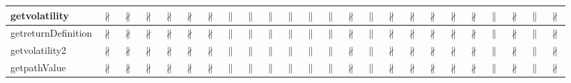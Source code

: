 \documentclass[10pt]{article}
\begin{document}
\begin{longtable}{|l|l|l|l|l|l|l|l|l|l|l|l|l|l|l|l|l|l|l|l|l|l|l|l|}
\hline
getvolatility&{\color{BrickRed}$\nparallel$}&{\color{BrickRed}$\nparallel$}&{\color{BrickRed}$\nparallel$}&{\color{BrickRed}$\nparallel$}&{\color{BrickRed}$\nparallel$}&{\color{BrickRed}$\nparallel$}&{\color{blue}$\parallel$}&{\color{blue}$\parallel$}&{\color{blue}$\parallel$}&{\color{blue}$\parallel$}&{\color{blue}$\parallel$}&{\color{blue}$\parallel$}&{\color{BrickRed}$\nparallel$}&{\color{blue}$\parallel$}&{\color{BrickRed}$\nparallel$}&{\color{BrickRed}$\nparallel$}&{\color{BrickRed}$\nparallel$}&{\color{BrickRed}$\nparallel$}&{\color{BrickRed}$\nparallel$}&{\color{blue}$\parallel$}&{\color{BrickRed}$\nparallel$}&{\color{blue}$\parallel$}&{\color{BrickRed}$\nparallel$}\\
\hline
getreturnDefinition&{\color{BrickRed}$\nparallel$}&{\color{BrickRed}$\nparallel$}&{\color{BrickRed}$\nparallel$}&{\color{BrickRed}$\nparallel$}&{\color{BrickRed}$\nparallel$}&{\color{BrickRed}$\nparallel$}&{\color{blue}$\parallel$}&{\color{blue}$\parallel$}&{\color{blue}$\parallel$}&{\color{blue}$\parallel$}&{\color{blue}$\parallel$}&{\color{blue}$\parallel$}&{\color{BrickRed}$\nparallel$}&{\color{blue}$\parallel$}&{\color{BrickRed}$\nparallel$}&{\color{BrickRed}$\nparallel$}&{\color{BrickRed}$\nparallel$}&{\color{BrickRed}$\nparallel$}&{\color{BrickRed}$\nparallel$}&{\color{blue}$\parallel$}&{\color{BrickRed}$\nparallel$}&{\color{blue}$\parallel$}&{\color{BrickRed}$\nparallel$}\\
\hline
getvolatility2&{\color{BrickRed}$\nparallel$}&{\color{BrickRed}$\nparallel$}&{\color{BrickRed}$\nparallel$}&{\color{BrickRed}$\nparallel$}&{\color{BrickRed}$\nparallel$}&{\color{BrickRed}$\nparallel$}&{\color{blue}$\parallel$}&{\color{blue}$\parallel$}&{\color{blue}$\parallel$}&{\color{blue}$\parallel$}&{\color{blue}$\parallel$}&{\color{blue}$\parallel$}&{\color{BrickRed}$\nparallel$}&{\color{blue}$\parallel$}&{\color{BrickRed}$\nparallel$}&{\color{BrickRed}$\nparallel$}&{\color{BrickRed}$\nparallel$}&{\color{BrickRed}$\nparallel$}&{\color{BrickRed}$\nparallel$}&{\color{blue}$\parallel$}&{\color{BrickRed}$\nparallel$}&{\color{blue}$\parallel$}&{\color{BrickRed}$\nparallel$}\\
\hline
getpathValue&{\color{BrickRed}$\nparallel$}&{\color{BrickRed}$\nparallel$}&{\color{BrickRed}$\nparallel$}&{\color{BrickRed}$\nparallel$}&{\color{BrickRed}$\nparallel$}&{\color{BrickRed}$\nparallel$}&{\color{blue}$\parallel$}&{\color{blue}$\parallel$}&{\color{blue}$\parallel$}&{\color{blue}$\parallel$}&{\color{blue}$\parallel$}&{\color{blue}$\parallel$}&{\color{BrickRed}$\nparallel$}&{\color{blue}$\parallel$}&{\color{BrickRed}$\nparallel$}&{\color{BrickRed}$\nparallel$}&{\color{BrickRed}$\nparallel$}&{\color{BrickRed}$\nparallel$}&{\color{BrickRed}$\nparallel$}&{\color{blue}$\parallel$}&{\color{BrickRed}$\nparallel$}&{\color{blue}$\parallel$}&{\color{BrickRed}$\nparallel$}\\

\end{longtable}
\end{document}
